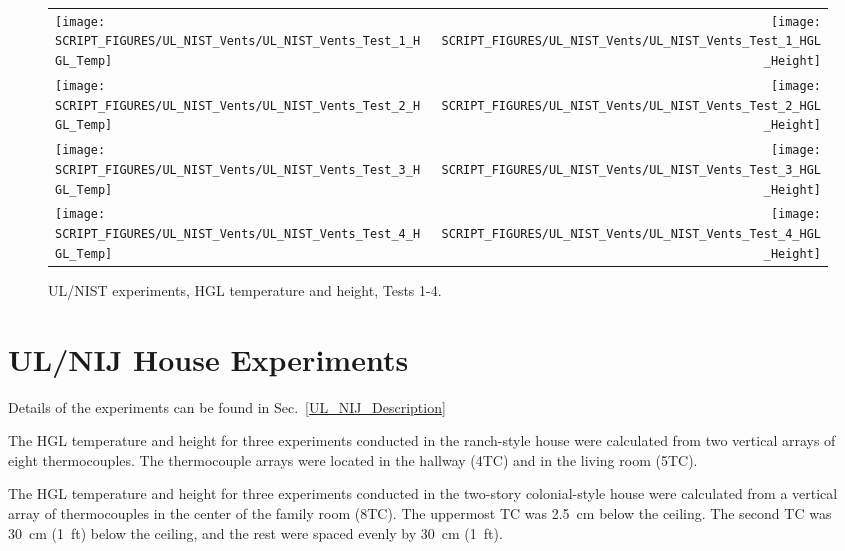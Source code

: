 \begin{figure}[p]
\begin{tabular*}{\textwidth}{l@{\extracolsep{\fill}}r}
\texttt{[image: SCRIPT\_FIGURES/UL\_NIST\_Vents/UL\_NIST\_Vents\_Test\_1\_HGL\_Temp]} &
\texttt{[image: SCRIPT\_FIGURES/UL\_NIST\_Vents/UL\_NIST\_Vents\_Test\_1\_HGL\_Height]} \\
\texttt{[image: SCRIPT\_FIGURES/UL\_NIST\_Vents/UL\_NIST\_Vents\_Test\_2\_HGL\_Temp]} &
\texttt{[image: SCRIPT\_FIGURES/UL\_NIST\_Vents/UL\_NIST\_Vents\_Test\_2\_HGL\_Height]} \\
\texttt{[image: SCRIPT\_FIGURES/UL\_NIST\_Vents/UL\_NIST\_Vents\_Test\_3\_HGL\_Temp]} &
\texttt{[image: SCRIPT\_FIGURES/UL\_NIST\_Vents/UL\_NIST\_Vents\_Test\_3\_HGL\_Height]} \\
\texttt{[image: SCRIPT\_FIGURES/UL\_NIST\_Vents/UL\_NIST\_Vents\_Test\_4\_HGL\_Temp]} &
\texttt{[image: SCRIPT\_FIGURES/UL\_NIST\_Vents/UL\_NIST\_Vents\_Test\_4\_HGL\_Height]}
\end{tabular*}
\caption[UL/NIST experiments, HGL temperature and height, Tests 1-4]
{UL/NIST experiments, HGL temperature and height, Tests 1-4.}
\label{UL_NIST_HGL}
\end{figure}

\clearpage

\section{UL/NIJ House Experiments}

Details of the experiments can be found in Sec.~\ref{UL_NIJ_Description}

The HGL temperature and height for three experiments conducted in the ranch-style house were calculated from two vertical arrays of eight thermocouples. The thermocouple arrays were located in the hallway (4TC) and in the living room (5TC).

The HGL temperature and height for three experiments conducted in the two-story colonial-style house were calculated from a vertical array of thermocouples in the center of the family room (8TC). The uppermost TC was 2.5~cm below the ceiling. The second TC was 30~cm (1~ft) below the ceiling, and the rest were spaced evenly by 30~cm (1~ft).

\newpage

